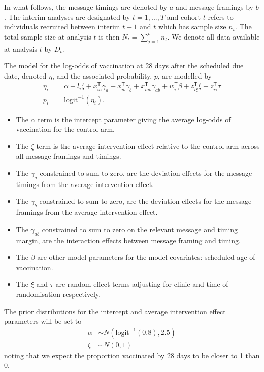 \documentclass[
  bibliography=totoc]{scrreprt}
\providecommand{\tightlist}{%
  \setlength{\itemsep}{0pt}\setlength{\parskip}{0pt}}
\begin{document}
In what follows, the message timings are denoted by \(a\) and message framings by \(b\).
The interim analyses are designated by \(t=1,...,T\) and cohort \(t\) refers to individuals recruited between interim \(t-1\) and \(t\) which has sample size \(n_t\).
The total sample size at analysis \(t\) is then \(N_t = \sum_{j=1}^t n_t\).
We denote all data available at analysis \(t\) by \(D_t\).

The model for the log-odds of vaccination at 28 days after the scheduled due date, denoted \(\eta\), and the associated probability, \(p\), are modelled by
\[
\begin{aligned}
\eta_i &= \alpha + l_i\zeta + x_{ia}^\mathsf{T}\gamma_a + x_{ib}^\mathsf{T}\gamma_b + x_{iab}^\mathsf{T}\gamma_{ab} + w_i^\mathsf{T}\beta + z_{i\xi}^\mathsf{T}\xi + z_{i\tau}^{\mathsf{T}}\tau\\
p_i &= \text{logit}^{-1}(\eta_i).
\end{aligned}
\]

\begin{itemize}
\tightlist
\item
  The \(\alpha\) term is the intercept parameter giving the average log-odds of vaccination for the control arm.
\item
  The \(\zeta\) term is the average intervention effect relative to the control arm across all message framings and timings.
\item
  The \(\gamma_a\) constrained to sum to zero, are the deviation effects for the message timings from the average intervention effect.
\item
  The \(\gamma_b\) constrained to sum to zero, are the deviation effects for the message framings from the average intervention effect.
\item
  The \(\gamma_{ab}\) constrained to sum to zero on the relevant message and timing margin, are the interaction effects between message framing and timing.
\item
  The \(\beta\) are other model parameters for the model covariates: scheduled age of vaccination.
\item
  The \(\xi\) and \(\tau\) are random effect terms adjusting for clinic and time of randomisation respectively.
\end{itemize}

The prior distributions for the intercept and average intervention effect parameters will be set to
\[
\begin{aligned}
\alpha &\sim N(\text{logit}^{-1}(0.8), 2.5) \\
\zeta &\sim N(0, 1)
\end{aligned}
\]
noting that we expect the proportion vaccinated by 28 days to be closer to 1 than 0.
\end{document}
